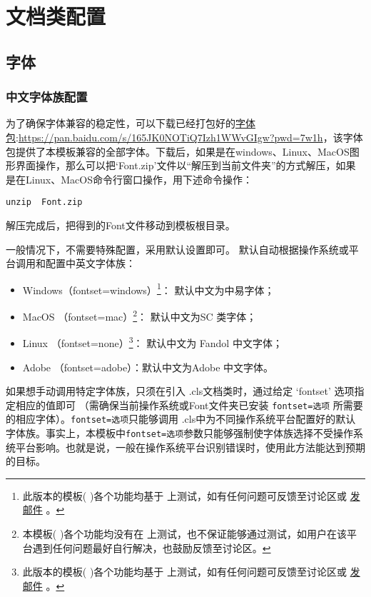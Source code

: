 \chapter{\projectname 文档类配置}\label{cha:clscfg}




\section{字体}\label{sec:fontset}
\subsection{中文字体族配置}
为了确保字体兼容的稳定性，可以下载已经打包好的\href{https://pan.baidu.com/s/165JK0NOTiQ7Izh1WWvGIgw?pwd=7w1h}{字体包}:\url{https://pan.baidu.com/s/165JK0NOTiQ7Izh1WWvGIgw?pwd=7w1h}，该字体包提供了本模板兼容的全部字体。下载后，如果是在windows、Linux、MacOS图形界面操作，那么可以把‘Font.zip’文件以“解压到当前文件夹”的方式解压，如果是在Linux、MacOS命令行窗口操作，用下述命令操作：
\begin{lstlisting}
unzip  Font.zip
\end{lstlisting}
解压完成后，把得到的Font文件移动到模板根目录。


 一般情况下，不需要特殊配置，采用默认设置即可。
\projectname 默认自动根据操作系统或平台调用和配置中英文字体族：
\begin{itemize}
    \item Windows（fontset=windows）\footnote{此版本的模板( \project )各个功能均基于 \projectwindows 上测试，如有任何问题可反馈至讨论区或 \href{mailto:\projectemail }{发邮件} 。}： 默认中文为中易字体；
    \item MacOS （fontset=mac）\footnote{本模板( \project )各个功能均没有在 \projectmacos 上测试，也不保证能够通过测试，如用户在该平台遇到任何问题最好自行解决，也鼓励反馈至讨论区。}： 默认中文为SC 类字体；
    \item Linux （fontset=none）\footnote{此版本的模板( \project )各个功能均基于 \projectlinux 上测试，如有任何问题可反馈至讨论区或 \href{mailto:\projectemail }{发邮件} 。}： 默认中文为 Fandol 中文字体；
    \item Adobe （fontset=adobe）：默认中文为Adobe 中文字体。
\end{itemize}
如果想手动调用特定字体族，只须在引入 \projectname.cls文档类时，通过给定 ‘fontset’ 选项指定相应的值即可 （需确保当前操作系统或Font文件夹已安装 \texttt{fontset=选项} 所需要的相应字体）。\texttt{fontset=选项}只能够调用 \projectname.cls中为不同操作系统平台配置好的默认字体族。事实上，本模板中\texttt{fontset=选项}参数只能够强制使字体族选择不受操作系统平台影响。也就是说，一般在操作系统平台识别错误时，使用此方法能达到预期的目标。

